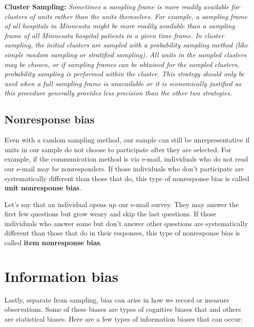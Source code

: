 \documentclass[
]{book}
\begin{document}
\textbf{Cluster Sampling:} \emph{Sometimes a sampling frame is more readily available for clusters of units rather than the units themselves. For example, a sampling frame of all hospitals in Minnesota might be more readily available than a sampling frame of all Minnesota hospital patients in a given time frame. In cluster sampling, the initial clusters are sampled with a probability sampling method (like simple random sampling or stratified sampling). All units in the sampled clusters may be chosen, or if sampling frames can be obtained for the sampled clusters, probability sampling is performed within the cluster. This strategy should only be used when a full sampling frame is unavailable or it is economically justified as this procedure generally provides less precision than the other two strategies.}

\hypertarget{nonresponse-bias}{%
\subsection{Nonresponse bias}\label{nonresponse-bias}}

Even with a random sampling method, our sample can still be unrepresentative if units in our sample do not choose to participate after they are selected. For example, if the communication method is via e-mail, individuals who do not read our e-mail may be nonresponders. If those individuals who don't participate are systematically different than those that do, this type of nonresponse bias is called \textbf{unit nonresponse bias}.

Let's say that an individual opens up our e-mail survey. They may answer the first few questions but grow weary and skip the last questions. If those individuals who answer some but don't answer other questions are systematically different than those that do in their responses, this type of nonresponse bias is called \textbf{item nonresponse bias}.

\hypertarget{information-bias}{%
\section{Information bias}\label{information-bias}}

Lastly, separate from sampling, bias can arise in how we record or measure observations. Some of these biases are types of cognitive biases that and others are statistical biases. Here are a few types of information biases that can occur:
\end{document}
